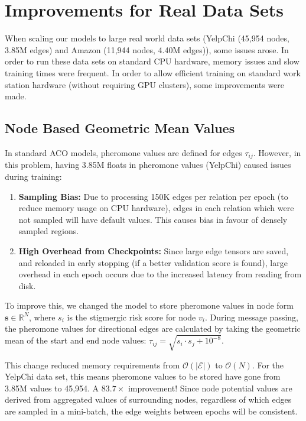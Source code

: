 \section[Improvements for Real Data Sets]{Improvements for Real Data Sets}
\label{sec:adaptations}
\label{sec:dataset_adaptations}

When scaling our models to large real world data sets (YelpChi (45,954 nodes, 3.85M edges) and Amazon (11,944 nodes, 4.40M edges)), some issues arose. In order to run these data sets on standard CPU hardware, memory issues and slow training times were frequent. In order to allow efficient training on standard work station hardware (without requiring GPU clusters), some improvements were made.

\subsection{Node Based Geometric Mean Values}
\label{subsec:node_pheromone}

In standard ACO models, pheromone values are defined for edges $\tau_{ij}$. However, in this problem, having 3.85M floats in pheromone values (YelpChi) caused issues during training:
\begin{enumerate}
    \item \textbf{Sampling Bias:} Due to processing 150K edges per relation per epoch (to reduce memory usage on CPU hardware), edges in each relation which were not sampled will have default values. This causes bias in favour of densely sampled regions.
    \item \textbf{High Overhead from Checkpoints:} Since large edge tensors are saved, and reloaded in early stopping (if a better validation score is found), large overhead in each epoch occurs due to the increased latency from reading from disk.
\end{enumerate}

To improve this, we changed the model to store pheromone values in node form $\mathbf{s} \in \mathbb{R}^{N}$, where $s_i$ is the stigmergic risk score for node $v_i$. During message passing, the pheromone values for directional edges are calculated by taking the geometric mean of the start and end node values: $\tau_{ij} = \sqrt{s_i \cdot s_j + 10^{-8}}$.

This change reduced memory requirements from $\mathcal{O}(|\mathcal{E}|)$ to $\mathcal{O}(N)$. For the YelpChi data set, this means pheromone values to be stored have gone from 3.85M values to 45,954. A $83.7\times$ improvement! Since node potential values are derived from aggregated values of surrounding nodes, regardless of which edges are sampled in a mini-batch, the edge weights between epochs will be consistent.

